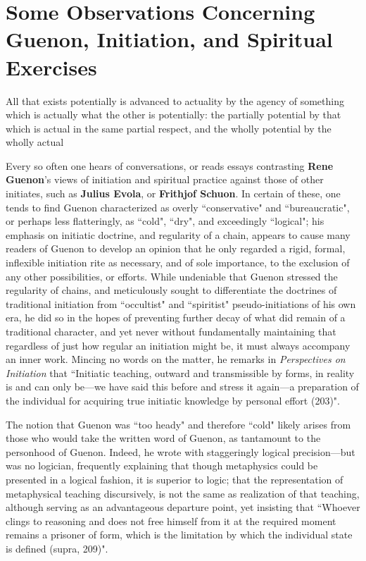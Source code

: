 \section[Some Observations Concerning Guenon...]{Some Observations Concerning Guenon, Initiation, and Spiritual Exercises}

\begin{quotex}
All that exists potentially is advanced to actuality by the agency of something which is actually what the other is potentially: the partially potential by that which is actual in the same partial respect, and the wholly potential by the wholly actual 


\end{quotex}
Every so often one hears of conversations, or reads essays contrasting \textbf{Rene Guenon}'s views of initiation and spiritual practice against those of other initiates, such as \textbf{Julius Evola}, or \textbf{Frithjof Schuon}. In certain of these, one tends to find Guenon characterized as overly ``conservative" and ``bureaucratic", or perhaps less flatteringly, as ``cold", ``dry", and exceedingly ``logical"; his emphasis on initiatic doctrine, and regularity of a chain, appears to cause many readers of Guenon to develop an opinion that he only regarded a rigid, formal, inflexible initiation rite as necessary, and of sole importance, to the exclusion of any other possibilities, or efforts. While undeniable that Guenon stressed the regularity of chains, and meticulously sought to differentiate the doctrines of traditional initiation from ``occultist" and ``spiritist" pseudo-initiations of his own era, he did so in the hopes of preventing further decay of what did remain of a traditional character, and yet never without fundamentally maintaining that regardless of just how regular an initiation might be, it must always accompany an inner work. Mincing no words on the matter, he remarks in \textit{Perspectives on Initiation} that ``Initiatic teaching, outward and transmissible by forms, in reality is and can only be—we have said this before and stress it again—a preparation of the individual for acquiring true initiatic knowledge by personal effort (203)".

The notion that Guenon was ``too heady" and therefore ``cold" likely arises from those who would take the written word of Guenon, as tantamount to the personhood of Guenon. Indeed, he wrote with staggeringly logical precision—but was no logician, frequently explaining that though metaphysics could be presented in a logical fashion, it is superior to logic; that the representation of metaphysical teaching discursively, is not the same as realization of that teaching, although serving as an advantageous departure point, yet insisting that ``Whoever clings to reasoning and does not free himself from it at the required moment remains a prisoner of form, which is the limitation by which the individual state is defined (supra, 209)".


